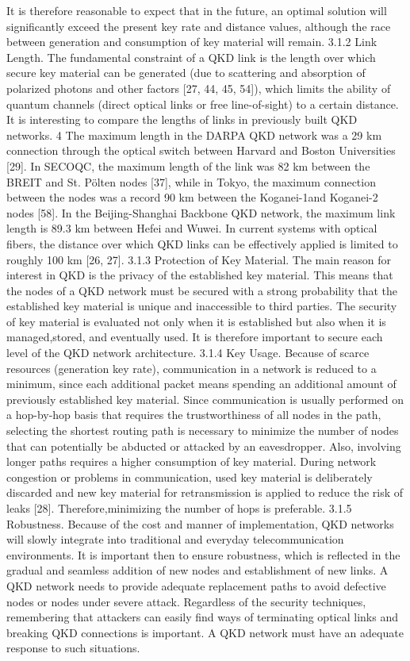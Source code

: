 It is therefore reasonable to expect that in the future, an optimal solution will significantly exceed the present key rate and distance values, although the race between generation and consumption of key material will remain.
3.1.2 Link Length. The fundamental constraint of a QKD link is the length over which secure key material can be generated (due to scattering and absorption of polarized photons and other factors [27, 44, 45, 54]), which limits the ability of quantum channels (direct optical links or free line-of-sight) to a certain distance. It is interesting to compare the lengths of links in previously built QKD networks. 4 The maximum length in the DARPA QKD network was a 29 km connection through the optical switch between Harvard and Boston Universities [29]. In SECOQC, the maximum length of the link was 82 km between the BREIT and St. Pölten nodes [37], while in Tokyo, the maximum connection between the nodes was a record 90 km between the Koganei-1and Koganei-2 nodes [58]. In the Beijing-Shanghai Backbone QKD network, the maximum link length is 89.3 km between Hefei and Wuwei.
In current systems with optical fibers, the distance over which QKD links can be effectively applied is limited to roughly 100 km [26, 27].
3.1.3 Protection of Key Material. The main reason for interest in QKD is the privacy of the established key material. This means that the nodes of a QKD network must be secured with a strong probability that the established key material is unique and inaccessible to third parties. The security of key material is evaluated not only when it is established but also when it is managed,stored, and eventually used. It is therefore important to secure each level of the QKD network architecture.
3.1.4 Key Usage. Because of scarce resources (generation key rate), communication in a network is reduced to a minimum, since each additional packet means spending an additional amount of previously established key material. Since communication is usually performed on a hop-by-hop basis that requires the trustworthiness of all nodes in the path, selecting the shortest routing path is necessary to minimize the number of nodes that can potentially be abducted or attacked by an eavesdropper. Also, involving longer paths requires a higher consumption of key material. During network congestion or problems in communication, used key material is deliberately discarded and new key material for retransmission is applied to reduce the risk of leaks [28]. Therefore,minimizing the number of hops is preferable.
3.1.5 Robustness. Because of the cost and manner of implementation, QKD networks will slowly integrate into traditional and everyday telecommunication environments. It is important then to ensure robustness, which is reflected in the gradual and seamless addition of new nodes and establishment of new links. A QKD network needs to provide adequate replacement paths to avoid defective nodes or nodes under severe attack. Regardless of the security techniques, remembering that attackers can easily find ways of terminating optical links and breaking QKD connections is important. A QKD network must have an adequate response to such situations.

